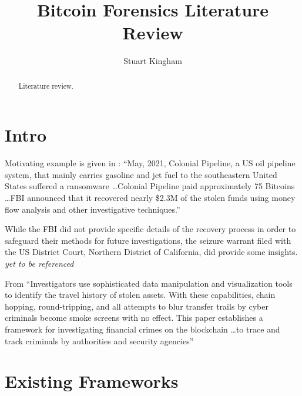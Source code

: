 \documentclass{article}
\title{Bitcoin Forensics Literature Review}
\author{Stuart Kingham}
\begin{document}
\maketitle

\begin{abstract}
Literature review.
\end{abstract}

\tableofcontents

\iffalse
1. \citetitle{Smith:2012jd}: “Article Title”
2. \parencite{Smith:2012qr}: A citation command in parentheses: (Smith and Jones 2023).
3. \textcite{Smith:2024jd}: For use in the flow of text: As Jones and Smith (2024) said ...
4. \autocite{Peixoto:2023}: A citation command which automatically switches style depend- ing on location and the option setting in the package declaration (see line 12 in the LaTeX source code). In this case, it produces a citation in parentheses: (Peixoto and Naor 2023).
\fi

\section{Intro}

Motivating example is given in  \autocite{Phan:2021}: ``May, 2021, Colonial Pipeline, a US oil pipeline system, that mainly carries gasoline and jet fuel to the southeastern United States suffered a ransomware \ldots Colonial Pipeline paid approximately 75 Bitcoins \ldots FBI announced that it recovered nearly \$2.3M of the stolen funds using money flow analysis and other investigative techniques.''

While the FBI did not provide specific details of the recovery process in order to safeguard their methods for future investigations, the seizure warrant filed with the US District Court, Northern District of California, did provide some insights. \textit{yet to be referenced}

From \textcite{Salisu:2023} ``Investigators use sophisticated data manipulation and visualization tools to identify the travel history of stolen assets. With these capabilities, chain hopping, round-tripping, and all attempts to blur transfer trails by cyber criminals become smoke screens with no effect. This paper establishes a framework for investigating financial crimes on the blockchain \ldots to trace and track criminals by authorities and security agencies''

\section{Existing Frameworks}
\end{document}
